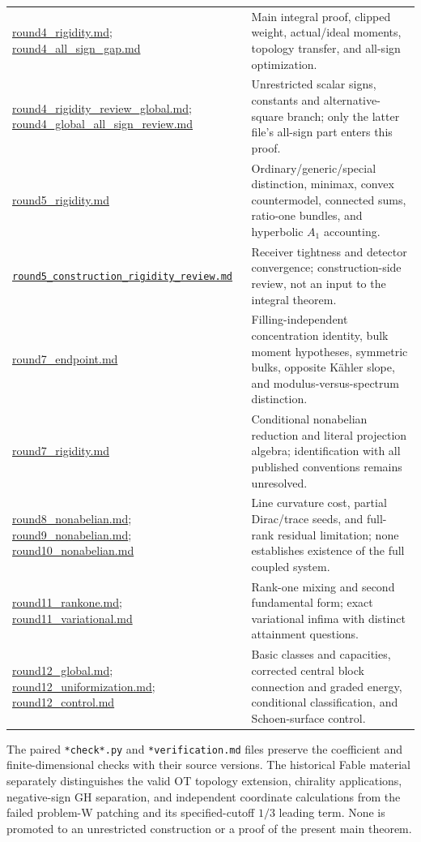 \documentclass[11pt,a4paper]{article}
\theoremstyle{definition}
\theoremstyle{remark}
\newcommand{\roundref}[2]{\href{run:../references/rounds/#1}{#2}}
\numberwithin{equation}{section}
\begin{document}
\begin{longtable}{L{.35\textwidth}L{.59\textwidth}}
\roundref{round4_rigidity.md}{round4\_rigidity.md};
\roundref{round4_all_sign_gap.md}{round4\_all\_sign\_gap.md} & Main integral
proof, clipped weight, actual/ideal moments, topology transfer, and
all-sign optimization.\\
\roundref{round4_rigidity_review_global.md}{round4\_rigidity\_review\_global.md};
\roundref{round4_global_all_sign_review.md}{round4\_global\_all\_sign\_review.md}
& Unrestricted scalar signs, constants and alternative-square branch;
only the latter file's all-sign part enters this proof.\\
\roundref{round5_rigidity.md}{round5\_rigidity.md} & Ordinary/generic/special
distinction, minimax, convex countermodel, connected sums, ratio-one
bundles, and hyperbolic $A_1$ accounting.\\
\roundref{round5_construction_rigidity_review.md}{\nolinkurl{round5_construction_rigidity_review.md}}
& Receiver tightness and detector convergence; construction-side review,
not an input to the integral theorem.\\
\roundref{round7_endpoint.md}{round7\_endpoint.md} & Filling-independent
concentration identity, bulk moment hypotheses, symmetric bulks,
opposite K\"ahler slope, and modulus-versus-spectrum distinction.\\
\roundref{round7_rigidity.md}{round7\_rigidity.md} & Conditional
nonabelian reduction and literal projection algebra; identification with
all published conventions remains unresolved.\\
\roundref{round8_nonabelian.md}{round8\_nonabelian.md};
\roundref{round9_nonabelian.md}{round9\_nonabelian.md};
\roundref{round10_nonabelian.md}{round10\_nonabelian.md} & Line curvature
cost, partial Dirac/trace seeds, and full-rank residual limitation;
none establishes existence of the full coupled system.\\
\roundref{round11_rankone.md}{round11\_rankone.md};
\roundref{round11_variational.md}{round11\_variational.md} & Rank-one
mixing and second fundamental form; exact variational infima with
distinct attainment questions.\\
\roundref{round12_global.md}{round12\_global.md};
\roundref{round12_uniformization.md}{round12\_uniformization.md};
\roundref{round12_control.md}{round12\_control.md} & Basic classes and
capacities, corrected central block connection and graded energy,
conditional classification, and Schoen-surface control.\\
\bottomrule
\end{longtable}
\normalsize
The paired \texttt{*check*.py} and \texttt{*verification.md} files preserve
the coefficient and finite-dimensional checks with their source versions.
The historical Fable material separately distinguishes the valid OT
topology extension, chirality applications, negative-sign GH separation,
and independent coordinate calculations from the failed problem-W
patching and its specified-cutoff $1/3$ leading term. None is promoted
to an unrestricted construction or a proof of the present main theorem.
\end{document}
